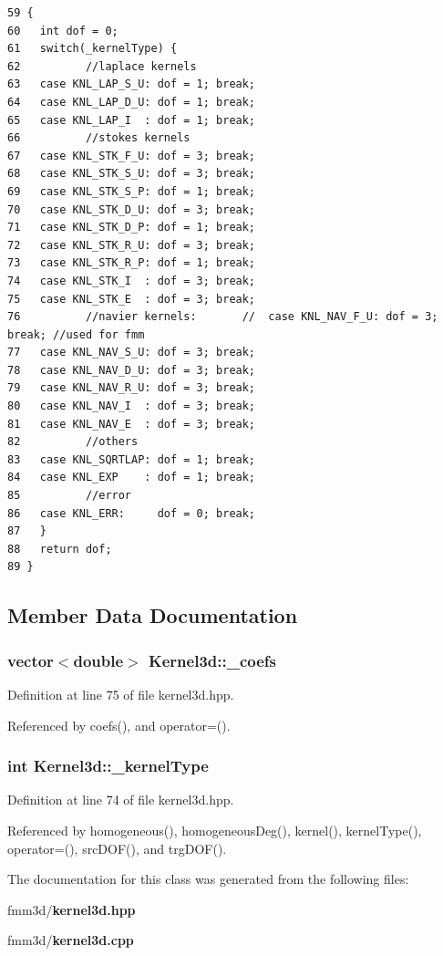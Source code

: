 \footnotesize\begin{verbatim}59 {
60   int dof = 0;
61   switch(_kernelType) {
62          //laplace kernels
63   case KNL_LAP_S_U: dof = 1; break;
64   case KNL_LAP_D_U: dof = 1; break;
65   case KNL_LAP_I  : dof = 1; break;
66          //stokes kernels
67   case KNL_STK_F_U: dof = 3; break;
68   case KNL_STK_S_U: dof = 3; break;
69   case KNL_STK_S_P: dof = 1; break;
70   case KNL_STK_D_U: dof = 3; break;
71   case KNL_STK_D_P: dof = 1; break;
72   case KNL_STK_R_U: dof = 3; break;
73   case KNL_STK_R_P: dof = 1; break;
74   case KNL_STK_I  : dof = 3; break;
75   case KNL_STK_E  : dof = 3; break;
76          //navier kernels:       //  case KNL_NAV_F_U: dof = 3; break; //used for fmm
77   case KNL_NAV_S_U: dof = 3; break;
78   case KNL_NAV_D_U: dof = 3; break;
79   case KNL_NAV_R_U: dof = 3; break;
80   case KNL_NAV_I  : dof = 3; break;
81   case KNL_NAV_E  : dof = 3; break;
82          //others
83   case KNL_SQRTLAP: dof = 1; break;
84   case KNL_EXP    : dof = 1; break;
85          //error
86   case KNL_ERR:     dof = 0; break;
87   }
88   return dof;
89 }
\end{verbatim}\normalsize 




\subsection{Member Data Documentation}
\subsubsection{\setlength{\rightskip}{0pt plus 5cm}vector$<$double$>$ {\bf Kernel3d::\_\-coefs}\hspace{0.3cm}{\tt  [protected]}}\label{classKernel3d_e3219078df8cea5b29e9e7bba8bee2b8_e3219078df8cea5b29e9e7bba8bee2b8}




Definition at line 75 of file kernel3d.hpp.

Referenced by coefs(), and operator=().
\subsubsection{\setlength{\rightskip}{0pt plus 5cm}int {\bf Kernel3d::\_\-kernel\-Type}\hspace{0.3cm}{\tt  [protected]}}\label{classKernel3d_6a4a9be8986c11a7006e77e743719e6c_6a4a9be8986c11a7006e77e743719e6c}




Definition at line 74 of file kernel3d.hpp.

Referenced by homogeneous(), homogeneous\-Deg(), kernel(), kernel\-Type(), operator=(), src\-DOF(), and trg\-DOF().

The documentation for this class was generated from the following files:\begin{CompactItemize}
\item 
fmm3d/{\bf kernel3d.hpp}\item 
fmm3d/{\bf kernel3d.cpp}\end{CompactItemize}
